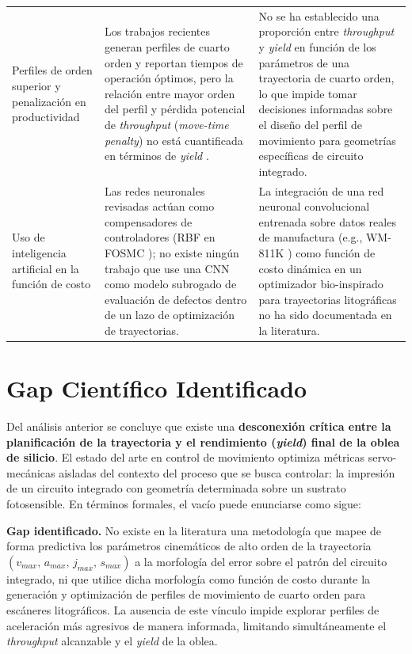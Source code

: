 \documentclass[11pt]{article}
\theoremstyle{definition}
\begin{document}
\begin{longtable}{L{3.2cm} L{5cm} L{5cm}}
Perfiles de orden superior y penalización en productividad &
Los trabajos recientes generan perfiles de cuarto orden y reportan tiempos de operación óptimos, pero la relación entre mayor orden del perfil y pérdida potencial de \textit{throughput} (\textit{move-time penalty}) no está cuantificada en términos de \textit{yield} \supercite{Heertjes2023_CDC, Al-Rawashdeh2023a}. &
No se ha establecido una proporción entre \textit{throughput} y \textit{yield} en función de los parámetros de una trayectoria de cuarto orden, lo que impide tomar decisiones informadas sobre el diseño del perfil de movimiento para geometrías específicas de circuito integrado. \\[4pt]

Uso de inteligencia artificial en la función de costo &
Las redes neuronales revisadas actúan como compensadores de controladores (RBF en FOSMC \supercite{Kuang2020}); no existe ningún trabajo que use una CNN como modelo subrogado de evaluación de defectos dentro de un lazo de optimización de trayectorias. &
La integración de una red neuronal convolucional entrenada sobre datos reales de manufactura (e.g., WM-811K \supercite{Wu2015_WM811K}) como función de costo dinámica en un optimizador bio-inspirado para trayectorias litográficas no ha sido documentada en la literatura. \\

\end{longtable}
\endgroup

\section{Gap Científico Identificado}

Del análisis anterior se concluye que existe una \textbf{desconexión crítica entre la planificación de la trayectoria y el rendimiento (\textit{yield}) final de la oblea de silicio}. El estado del arte en control de movimiento optimiza métricas servo-mecánicas aisladas del contexto del proceso que se busca controlar: la impresión de un circuito integrado con geometría determinada sobre un sustrato fotosensible. En términos formales, el vacío puede enunciarse como sigue:

\begin{framed}
\textbf{Gap identificado.} No existe en la literatura una metodología que mapee de forma predictiva los parámetros cinemáticos de alto orden de la trayectoria $(v_{max},\, a_{max},\, j_{max},\, s_{max})$ a la morfología del error sobre el patrón del circuito integrado, ni que utilice dicha morfología como función de costo durante la generación y optimización de perfiles de movimiento de cuarto orden para escáneres litográficos. La ausencia de este vínculo impide explorar perfiles de aceleración más agresivos de manera informada, limitando simultáneamente el \textit{throughput} alcanzable y el \textit{yield} de la oblea.
\end{framed}
\end{document}
